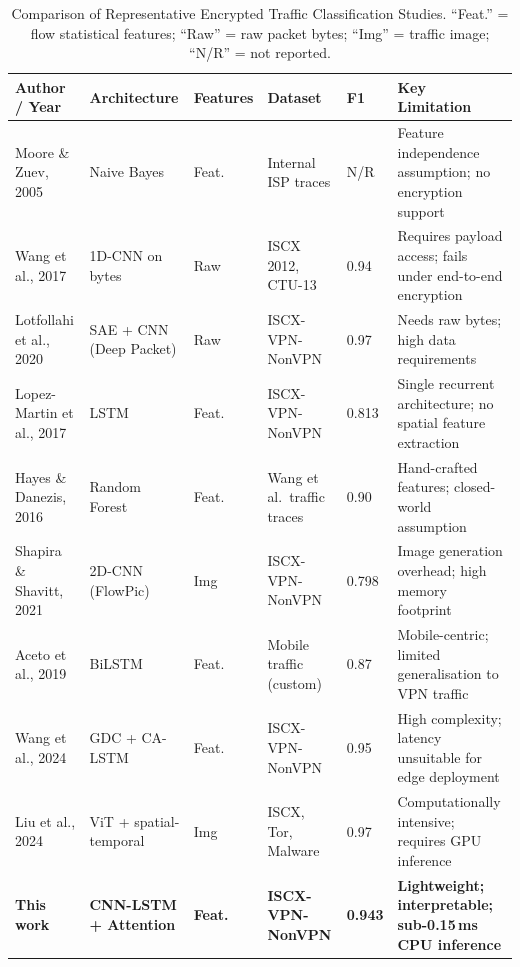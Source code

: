 \documentclass[conference]{IEEEtran}
\begin{document}
\begin{table}[t]
\centering
\renewcommand{\arraystretch}{1.18}
\caption{Comparison of Representative Encrypted Traffic Classification Studies.
         ``Feat.'' = flow statistical features; ``Raw'' = raw packet bytes;
         ``Img'' = traffic image; ``N/R'' = not reported.}
\label{tab:related}
\begin{tabular}{p{3.0cm} p{3.4cm} p{1.9cm} p{2.3cm} p{0.9cm} p{3.4cm}}
\toprule
\textbf{Author / Year} & \textbf{Architecture} & \textbf{Features} &
\textbf{Dataset} & \textbf{F1} & \textbf{Key Limitation} \\
\midrule
Moore \& Zuev, 2005 \cite{moore2005}
  & Naive Bayes
  & Feat.
  & Internal ISP traces
  & N/R
  & Feature independence assumption; no encryption support \\

Wang et al., 2017 \cite{wang2017endtoend}
  & 1D-CNN on bytes
  & Raw
  & ISCX 2012, CTU-13
  & 0.94
  & Requires payload access; fails under end-to-end encryption \\

Lotfollahi et al., 2020 \cite{lotfollahi2020}
  & SAE + CNN (Deep Packet)
  & Raw
  & ISCX-VPN-NonVPN
  & 0.97
  & Needs raw bytes; high data requirements \\

Lopez-Martin et al., 2017 \cite{lopezmartin2017}
  & LSTM
  & Feat.
  & ISCX-VPN-NonVPN
  & 0.813
  & Single recurrent architecture; no spatial feature extraction \\

Hayes \& Danezis, 2016 \cite{hayes2016}
  & Random Forest
  & Feat.
  & Wang et al.\ traffic traces
  & 0.90
  & Hand-crafted features; closed-world assumption \\

Shapira \& Shavitt, 2021 \cite{shapira2021}
  & 2D-CNN (FlowPic)
  & Img
  & ISCX-VPN-NonVPN
  & 0.798
  & Image generation overhead; high memory footprint \\

Aceto et al., 2019 \cite{aceto2019}
  & BiLSTM
  & Feat.
  & Mobile traffic (custom)
  & 0.87
  & Mobile-centric; limited generalisation to VPN traffic \\

Wang et al., 2024 \cite{wang2024}
  & GDC + CA-LSTM
  & Feat.
  & ISCX-VPN-NonVPN
  & 0.95
  & High complexity; latency unsuitable for edge deployment \\

Liu et al., 2024 \cite{liu2024}
  & ViT + spatial-temporal
  & Img
  & ISCX, Tor, Malware
  & 0.97
  & Computationally intensive; requires GPU inference \\

\textbf{This work}
  & \textbf{CNN-LSTM + Attention}
  & \textbf{Feat.}
  & \textbf{ISCX-VPN-NonVPN}
  & \textbf{0.943}
  & \textbf{Lightweight; interpretable; sub-0.15\,ms CPU inference} \\
\bottomrule
\end{tabular}
\end{table}
\end{document}
